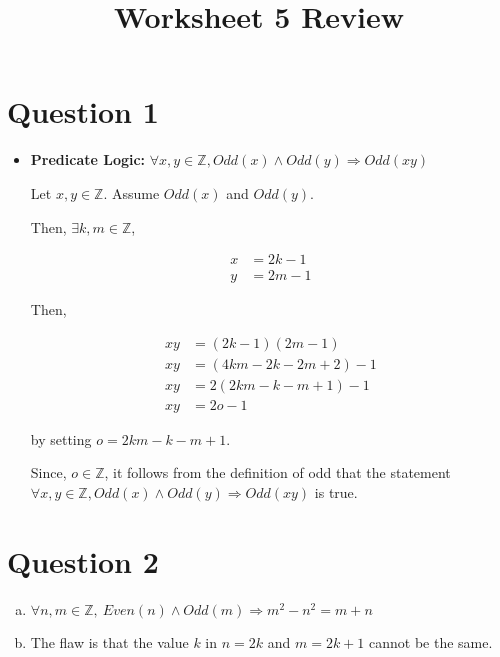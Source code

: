 \documentclass[12pt]{article}
\begin{document}
\title{Worksheet 5 Review}
\maketitle

\section*{Question 1}
\begin{itemize}
    \item

    \textbf{Predicate Logic:} $\forall x,y \in \mathbb{Z}, Odd(x) \land Odd(y)
    \Rightarrow Odd(xy)$

    \bigskip

    Let $x,y \in \mathbb{Z}$. Assume $Odd(x)$ and $Odd(y)$.

    \bigskip

    Then, $\exists k,m \in \mathbb{Z}$,

    \begin{align}
        x &= 2k - 1\\
        y &= 2m - 1
    \end{align}

    \bigskip

    Then,

    \begin{align}
        xy &= (2k-1)(2m-1)\\
        xy &= (4km - 2k - 2m + 2) - 1\\
        xy &= 2(2km - k - m + 1) - 1\\
        xy &= 2o - 1
    \end{align}

    by setting $o = 2km - k - m + 1$.

    \bigskip

    Since, $o \in \mathbb{Z}$, it follows from the definition of odd that the statement
    $\forall x,y \in \mathbb{Z}, Odd(x) \land Odd(y) \Rightarrow Odd(xy)$ is true.
\end{itemize}

\section*{Question 2}
\begin{enumerate}[a.]
    \item

    $\forall n,m \in \mathbb{Z},\:Even(n) \land Odd(m) \Rightarrow m^2 - n^2 = m + n$

    \item

    The flaw is that the value $k$ in $n = 2k$ and $m = 2k + 1$ cannot be the same.
\end{enumerate}
\end{document}
